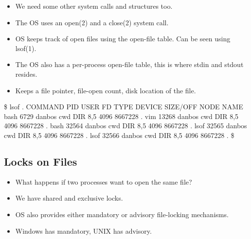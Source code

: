 \documentclass{beamer}
\begin{document}
\begin{frame}{\insertsubsectionhead}
  \begin{itemize}
    \item We need some other system calls and structures too.

    \item The OS uses an open(2) and a close(2) system call.

    \item OS keeps track of open files using the open-file table.
      Can be seen using lsof(1).

    \item The OS also has a per-process open-file table, this is where stdin 
      and stdout resides.

    \item Keeps a file pointer, file-open count, disk location of the file.

  \end{itemize}
\end{frame}

\begin{frame}[fragile]{\insertsubsectionhead}
  \begin{terminal}[basicstyle=\tiny\tt,numberstyle=\tiny]
\$ lsof .
COMMAND   PID   USER   FD   TYPE DEVICE SIZE/OFF    NODE NAME
bash     6729 danbos  cwd    DIR    8,5     4096 8667228 .
vim     13268 danbos  cwd    DIR    8,5     4096 8667228 .
bash    32564 danbos  cwd    DIR    8,5     4096 8667228 .
lsof    32565 danbos  cwd    DIR    8,5     4096 8667228 .
lsof    32566 danbos  cwd    DIR    8,5     4096 8667228 .
\$
  \end{terminal}
\end{frame}

\subsection{Locks on Files}

\begin{frame}{\insertsubsectionhead}
  \begin{itemize}
    \item What happens if two processes want to open the same file?

    \item We have shared and exclusive locks.

    \item OS also provides either mandatory or advisory file-locking 
      mechanisms.

    \item Windows has mandatory, UNIX has advisory.

  \end{itemize}
\end{frame}
\end{document}
